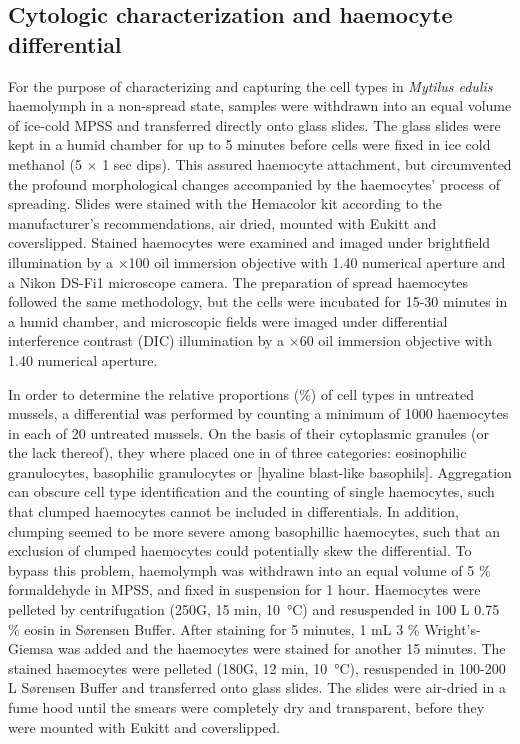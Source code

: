 \subsection{Cytologic characterization and haemocyte differential} 
For the purpose of characterizing and capturing the cell types in  \emph{Mytilus edulis} haemolymph in a non-spread state, samples were withdrawn into an equal volume of ice-cold MPSS and transferred directly onto glass slides. The glass slides were kept in a humid chamber for up to 5 minutes before cells were fixed in ice cold methanol (5 $\times$ 1 sec dips). This assured haemocyte attachment, but circumvented the profound morphological changes accompanied by the haemocytes' process of spreading. Slides were stained with the Hemacolor\textsuperscript{\textregistered} kit according to the manufacturer's recommendations, air dried, mounted with Eukitt\textsuperscript{\textregistered} and coverslipped. Stained haemocytes were examined and imaged under brightfield illumination by a $\times$100 oil immersion objective with 1.40 numerical aperture and a Nikon DS-Fi1 microscope camera. The preparation of spread haemocytes followed the same methodology, but the cells were incubated for 15-30 minutes in a humid chamber, and microscopic fields were imaged under differential interference contrast (DIC) illumination by a $\times$60 oil immersion objective with 1.40 numerical aperture.

In order to determine the relative proportions (\%) of cell types in untreated mussels, a differential was performed by counting a minimum of 1000 haemocytes in each of 20 untreated mussels. On the basis of their cytoplasmic granules (or the lack thereof), they where placed one in of three categories: eosinophilic granulocytes, basophilic granulocytes or [hyaline blast-like basophils]. Aggregation can obscure cell type identification and the counting of single haemocytes, such that clumped haemocytes cannot be included in differentials. In addition, clumping seemed to be more severe among basophillic haemocytes, such that an exclusion of clumped haemocytes could potentially skew the differential. To bypass this problem, haemolymph was withdrawn into an equal volume of 5 \% formaldehyde in MPSS, and fixed in suspension for 1 hour. Haemocytes were pelleted by centrifugation (250G, 15 min, \SI{10}{\celsius}) and resuspended in 100 \micro L 0.75 \% eosin in Sørensen Buffer. After staining for 5 minutes, 1 mL 3 \% Wright's-Giemsa was added and the haemocytes were stained for another 15 minutes. The stained haemocytes were pelleted (180G, 12 min, \SI{10}{\celsius}), resuspended in 100-200 \micro L Sørensen Buffer and transferred onto glass slides. The slides were air-dried in a fume hood until the smears were completely dry and transparent, before they were mounted with Eukitt\textsuperscript{\textregistered} and coverslipped.

